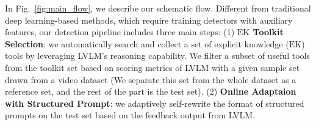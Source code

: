 
In Fig.~\ref{fig:main_flow}, we describe our schematic flow. Different from traditional deep learning-based methods, which require training detectors with auxiliary features, our detection pipeline includes three main steps: (1) \textbf{$\text{EK}$ Toolkit Selection}: we automatically search and collect a set of explicit knowledge ($\text{EK}$) tools by leveraging LVLM's reasoning capability. We filter a subset of useful tools from the toolkit set based on scoring metrics of LVLM with a given sample set drawn from a video dataset (We separate this set from the whole dataset as a reference set, and the rest of the part is the test set). (2) \textbf{Online Adaptaion with Structured Prompt}: we adaptively self-rewrite the format of structured prompts on the test set based on the feedback output from LVLM. 

